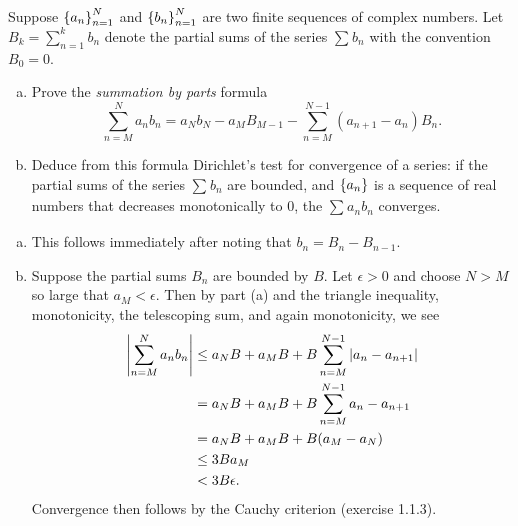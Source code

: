 \begin{exrc}[7]
    Suppose \(\set{a_n}_{n = 1}^N\) and \(\set{b_n}_{n = 1}^{N}\) are two finite
    sequences of complex numbers.
    Let \(B_k = \sum_{n = 1}^{k} b_n\) denote the partial sums of the series \(\sum_{}^{} b_n\)
    with the convention \(B_0 = 0\).
    \begin{enumerate}[(a)]
    \item
        Prove the \emph{summation by parts} formula
        \begin{equation*}
            \sum_{n = M}^{N} a_n b_n
            = a_N b_N - a_M B_{M - 1} - \sum_{n = M}^{N - 1} (a_{n + 1} - a_n) B_n.
        \end{equation*}
    \item
        Deduce from this formula Dirichlet's test for convergence of a series:
        if the partial sums of the series \(\sum_{}^{} b_n\) are bounded,
        and \(\set{a_n}\) is a sequence of real numbers that decreases monotonically to 0,
        the \(\sum_{}^{} a_n b_n\) converges.
    \end{enumerate}

\begin{soln}
    \begin{enumerate}[(a)]
    \item
        This follows immediately after noting that \(b_n = B_n - B_{n - 1}\).
    \item
        Suppose the partial sums \(B_n\) are bounded by \(B\).
        Let \(\epsilon > 0\) and choose \(N > M\) so large that \(a_M < \epsilon\).
        Then by part (a) and the triangle inequality,
        monotonicity, the telescoping sum, and again monotonicity, we see
        \begin{align*}
            \abs{\sum_{n = M}^{N} a_n b_n}
            & \leq a_N B + a_M B + B \sum_{n = M}^{N - 1} |a_n - a_{n + 1}| \\
            & = a_N B + a_M B + B \sum_{n = M}^{N - 1} a_n - a_{n + 1} \\
            & = a_N B + a_M B + B(a_M - a_N) \\
            & \leq 3B a_M \\
            & < 3B \epsilon.
        \end{align*}
        Convergence then follows by the Cauchy criterion (exercise 1.1.3).
    \end{enumerate}

\end{soln}
\end{exrc}
